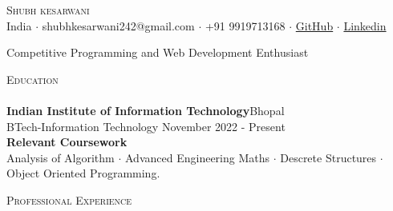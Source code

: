 \documentclass[a4paper]{article}
\newcommand{\lineunder} {
    \vspace*{-8pt} \\
    \hspace*{-18pt} \hrulefill \\
}
\newcommand{\header} [1] {
    {\hspace*{-18pt}\vspace*{6pt} \textsc{#1}}
    \vspace*{-6pt} \lineunder
}
\begin{document}
\vspace*{-40pt}

    

\vspace*{-9pt}
\begin{center}
	{\Huge \scshape {Shubh kesarwani}}\\
	\vspace{2mm}
	India $\cdot$ shubhkesarwani242@gmail.com $\cdot$ +91 9919713168 $\cdot$ \href{https://github.com/Shubhkesarwani02}{GitHub} $\cdot$ \href{https:/www.linkedin.com/in/shubh-kesarwani-537b30256/}{Linkedin} \\
\end{center}

\begin{center}
 Competitive Programming and Web Development Enthusiast\\
\end{center}

\header{Education}
\vspace{0mm}
\textbf{Indian Institute of Information Technology}\hfill Bhopal\\
BTech-Information Technology \hfill November 2022 - Present\\

\textbf{Relevant Coursework}\\
Analysis of Algorithm $\cdot$ Advanced Engineering Maths $\cdot$ Descrete Structures $\cdot$ Object Oriented Programming.\\
\vspace{4mm}
 


\vspace{-2mm}
\header{Professional Experience}
\end{document}
